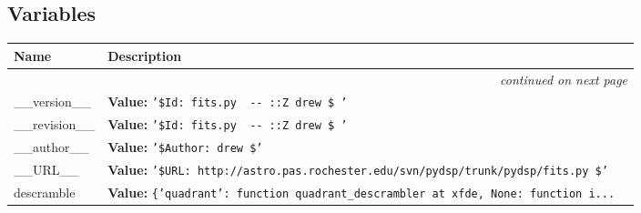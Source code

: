 
  \subsection{Variables}

\begin{longtable}{|p{}|p{}|l}
\cline{1-2}
\cline{1-2} \centering \textbf{Name} & \centering \textbf{Description}& \\
\cline{1-2}
\endhead\cline{1-2}\multicolumn{3}{r}{\small\textit{continued on next page}}\\\endfoot\cline{1-2}
\endlastfoot\raggedright \_\-\_\-v\-e\-r\-s\-i\-o\-n\-\_\-\_\- & \textbf{Value:} 
{\tt '\-\$\-I\-d\-:\-~\-f\-i\-t\-s\-.\-p\-y\-~\-4\-0\-0\-~\-2\-0\-0\-6\--\-0\-6\--\-1\-9\-~\-2\-2\-:\-3\-9\-:\-3\-0\-Z\-~\-d\-r\-e\-w\-~\-\$\-~\-'\-}&\\
\cline{1-2}
\raggedright \_\-\_\-r\-e\-v\-i\-s\-i\-o\-n\-\_\-\_\- & \textbf{Value:} 
{\tt '\-\$\-I\-d\-:\-~\-f\-i\-t\-s\-.\-p\-y\-~\-4\-0\-0\-~\-2\-0\-0\-6\--\-0\-6\--\-1\-9\-~\-2\-2\-:\-3\-9\-:\-3\-0\-Z\-~\-d\-r\-e\-w\-~\-\$\-~\-'\-}&\\
\cline{1-2}
\raggedright \_\-\_\-a\-u\-t\-h\-o\-r\-\_\-\_\- & \textbf{Value:} 
{\tt '\-\$\-A\-u\-t\-h\-o\-r\-:\-~\-d\-r\-e\-w\-~\-\$\-'\-}&\\
\cline{1-2}
\raggedright \_\-\_\-U\-R\-L\-\_\-\_\- & \textbf{Value:} 
{\tt '\-\$\-U\-R\-L\-:\-~\-h\-t\-t\-p\-:\-/\-/\-a\-s\-t\-r\-o\-.\-p\-a\-s\-.\-r\-o\-c\-h\-e\-s\-t\-e\-r\-.\-e\-d\-u\-/\-s\-v\-n\-/\-p\-y\-d\-s\-p\-/\-t\-r\-u\-n\-k\-/\-p\-y\-d\-s\-p\-/\-f\-i\-t\-s\-.\-p\-y\-~\-\$\-'\-}&\\
\cline{1-2}
\raggedright d\-e\-s\-c\-r\-a\-m\-b\-l\-e\- & \textbf{Value:} 
{\tt \{\-'\-q\-u\-a\-d\-r\-a\-n\-t\-'\-:\-~\-{\textless}\-f\-u\-n\-c\-t\-i\-o\-n\-~\-q\-u\-a\-d\-r\-a\-n\-t\-\_\-d\-e\-s\-c\-r\-a\-m\-b\-l\-e\-r\-~\-a\-t\-~\-0\-x\-f\-6\-d\-e\-8\-4\-5\-4\-{\textgreater}\-,\-~\-N\-o\-n\-e\-:\-~\-{\textless}\-f\-u\-n\-c\-t\-i\-o\-n\-~\-i\-.\-.\-.\-}&\\
\cline{1-2}
\end{longtable}



